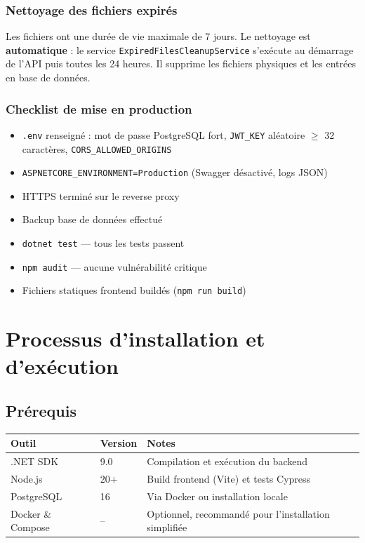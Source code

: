 \documentclass[12pt,a4paper]{article}
\begin{document}
\subsubsection{Nettoyage des fichiers expir\'es}

Les fichiers ont une dur\'ee de vie maximale de 7 jours. Le nettoyage est \textbf{automatique} : le service \texttt{ExpiredFilesCleanupService} s'ex\'ecute au d\'emarrage de l'API puis toutes les 24 heures. Il supprime les fichiers physiques et les entr\'ees en base de donn\'ees.

\subsubsection{Checklist de mise en production}

\begin{itemize}[nosep]
  \item[$\square$] \texttt{.env} renseign\'e : mot de passe PostgreSQL fort, \texttt{JWT\_KEY} al\'eatoire $\geq$ 32 caract\`eres, \texttt{CORS\_ALLOWED\_ORIGINS}
  \item[$\square$] \texttt{ASPNETCORE\_ENVIRONMENT=Production} (Swagger d\'esactiv\'e, logs JSON)
  \item[$\square$] HTTPS termin\'e sur le reverse proxy
  \item[$\square$] Backup base de donn\'ees effectu\'e
  \item[$\square$] \texttt{dotnet test} --- tous les tests passent
  \item[$\square$] \texttt{npm audit} --- aucune vuln\'erabilit\'e critique
  \item[$\square$] Fichiers statiques frontend build\'es (\texttt{npm run build})
\end{itemize}

\section{Processus d'installation et d'ex\'ecution}

\subsection{Pr\'erequis}

\begin{longtable}{p{4cm} p{3cm} p{7cm}}
\toprule
\textbf{Outil} & \textbf{Version} & \textbf{Notes} \\
\midrule
\endhead
.NET SDK & 9.0 & Compilation et ex\'ecution du backend \\
Node.js & 20+ & Build frontend (Vite) et tests Cypress \\
PostgreSQL & 16 & Via Docker ou installation locale \\
Docker \& Compose & -- & Optionnel, recommand\'e pour l'installation simplifi\'ee \\
\bottomrule
\end{longtable}
\end{document}
